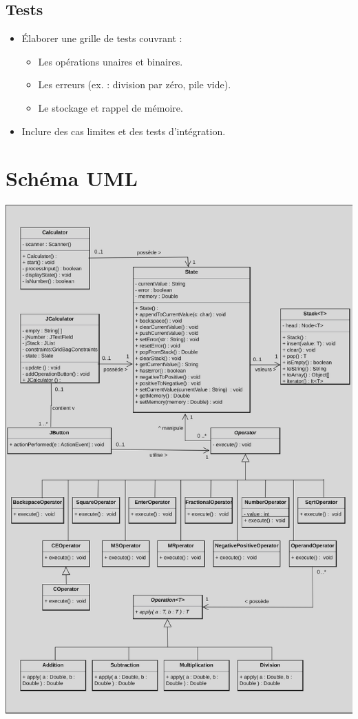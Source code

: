 \documentclass[12pt]{report}
\begin{document}
            \subsection*{Tests}
                \begin{itemize}
                    \item Élaborer une grille de tests couvrant :
                    \begin{itemize}
                        \item Les opérations unaires et binaires.
                        \item Les erreurs (ex. : division par zéro, pile vide).
                        \item Le stockage et rappel de mémoire.
                    \end{itemize}

                    \item Inclure des cas limites et des tests d'intégration.
                \end{itemize}

    \section*{Schéma UML}
    \includegraphics[scale=0.3]{images/diagram}
\end{document}
